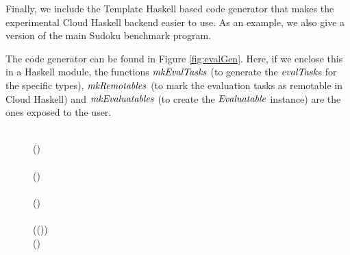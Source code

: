 \documentclass[paper=A4,twoside=true,openright,parskip=full,chapterprefix=true,headings=normal,bibliography=totoc,listof=totoc,titlepage=on,captions=tableabove,draft=false,british]{scrreprt}%
\begin{document}
\label{sec:appendixCloudHaskell}

Finally, we include the Template Haskell based code generator that makes
the experimental Cloud Haskell backend easier to use. As an example, we
also give a version of the main Sudoku benchmark program.

The code generator can be found in Figure \ref{fig:evalGen}. Here, if we
enclose this in a Haskell module, the functions \ensuremath{\Varid{mkEvalTasks}} (to
generate the \ensuremath{\Varid{evalTask}}s for the specific types), \ensuremath{\Varid{mkRemotables}} (to
mark the evaluation tasks as remotable in Cloud Haskell) and
\ensuremath{\Varid{mkEvaluatables}} (to create the \ensuremath{\Conid{Evaluatable}} instance) are the ones
exposed to the user.

\begin{figure}
\centering
\begin{hscode}\SaveRestoreHook
{}%
%
%
%
%
%
\>[B]{}\mathbin{::}\to {}\to {}\<[E]%
\\
\>[B]{}\;\;\mathrel{=}(\;){}\<[E]%
\\[\blanklineskip]%
\>[B]{}\mathbin{::}\to {}\to {}\<[E]%
\\
\>[B]{}\;\;\mathrel{=}(\;)\<[E]%
\\[\blanklineskip]%
\>[B]{}\mathbin{::}\to {}\to {}\<[E]%
\\
\>[B]{}\;\;\mathrel{=}()\<[E]%
\\[\blanklineskip]%
\>[B]{}\mathbin{::}\to {}\<[E]%
\\
\>[B]{}\;(\;(\;)\;\anonymous )\mathrel{=}{}\<[E]%
\\
\>[B]{}\<[5]%
\>[5]{}\mathbin{\$}(\plus {}\plus {}){}\<[E]%

\end{hscode}
\end{figure}
\end{document}
